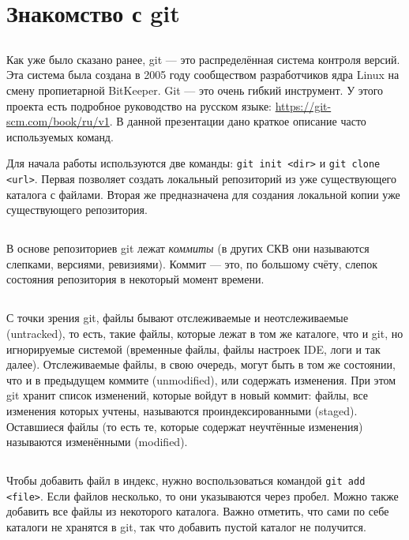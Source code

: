 \documentclass{article}
\begin{document}
\section{Знакомство с git}

\subsection{}
Как уже было сказано ранее, git --- это распределённая система контроля версий. Эта система была создана в 2005 году сообществом разработчиков ядра Linux на смену пропиетарной BitKeeper. Git --- это очень гибкий инструмент. У этого проекта есть подробное руководство на русском языке: {\color{blue} \url{https://git-scm.com/book/ru/v1}}. В данной презентации дано краткое описание часто используемых команд.

Для начала работы используются две команды: \texttt{git init <dir>} и \texttt{git clone <url>}. Первая позволяет создать локальный репозиторий из уже существующего каталога с файлами. Вторая же предназначена для создания локальной копии уже существующего репозитория.

\subsection{}
В основе репозиториев git лежат \emph{коммиты} (в других СКВ они называются слепками, версиями, ревизиями). Коммит --- это, по большому счёту, слепок состояния репозитория в некоторый момент времени. 

\subsection{}
С точки зрения git, файлы бывают отслеживаемые и неотслеживаемые (untracked), то есть, такие файлы, которые лежат в том же каталоге, что и git, но игнорируемые системой (временные файлы, файлы настроек IDE, логи и так далее). Отслеживаемые файлы, в свою очередь, могут быть в том же состоянии, что и в предыдущем коммите (unmodified), или содержать изменения. При этом git хранит список изменений, которые войдут в новый коммит: файлы, все изменения которых учтены, называются проиндексированными (staged). Оставшиеся файлы (то есть те, которые содержат неучтённые изменения) называются изменёнными (modified).

\subsection{}
Чтобы добавить файл в индекс, нужно воспользоваться командой \texttt{git add <file>}. Если файлов несколько, то они указываются через пробел. Можно также добавить все файлы из некоторого каталога. Важно отметить, что сами по себе каталоги не хранятся в git, так что добавить пустой каталог не получится.
\end{document}
